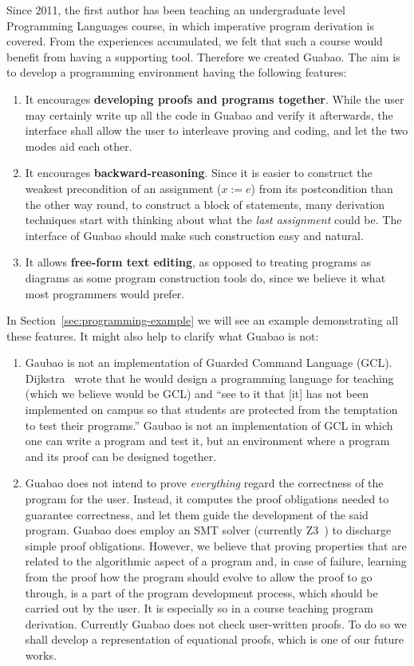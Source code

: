 \documentclass[runningheads]{llncs}
\newcommand{\Varid}[1]{\mathit{#1}}
\let\Varid\mathit
\begin{document}
Since 2011, the first author has been teaching an undergraduate level Programming Languages course, in which imperative program derivation is covered.
From the experiences accumulated, we felt that such a course would benefit from having a supporting tool.
Therefore we created Guabao.
The aim is to develop a programming environment having the following features:
\begin{enumerate}
\item It encourages {\bf developing proofs and programs together}.
While the user may certainly write up all the code in Guabao and verify it afterwards, the interface shall allow the user to interleave proving and coding, and let the two modes aid each other.
\item It encourages {\bf backward-reasoning}.
Since it is easier to construct the weakest precondition of an assignment (\ensuremath{\Varid{x}\mathbin{:=}\Varid{e}}) from its postcondition than the other way round,
to construct a block of statements, many derivation techniques start with thinking about what the \emph{last assignment} could be.
The interface of Guabao should make such construction easy and natural.
\item It allows {\bf free-form text editing}, as opposed to treating programs as diagrams as some program construction tools do, since we believe it what most programmers would prefer.
\end{enumerate}
In Section~\ref{sec:programming-example} we will see an example demonstrating all these features.
It might also help to clarify what Guabao is not:
\begin{enumerate}
\item Gaubao is not an implementation of Guarded Command Language (GCL).
Dijkstra~\cite{Dijkstra:98:Cruelty} wrote that he would
design a programming language for teaching (which we believe would be GCL) and ``see to it that [it] has not been implemented on campus so that students are protected from the temptation to test their programs.''
Gaubao is not an implementation of GCL in which one can write a program and test it, but an environment where a program and its proof can be designed together.
\item Guabao does not intend to prove \emph{everything} regard the correctness of the program for the user.
Instead, it computes the proof obligations needed to guarantee correctness, and let them guide the development of the said program.
Guabao does employ an SMT solver (currently Z3~\cite{MS:12:Z3}) to discharge simple proof obligations.
However, we believe that proving properties that are related to the algorithmic aspect of a program and, in case of failure, learning from the proof how the program should evolve to allow the proof to go through, is a part of the program development process, which should be carried out by the user.
It is especially so in a course teaching program derivation.
Currently Guabao does not check user-written proofs.
To do so we shall develop a representation of equational proofs, which is one of our future works.
\end{enumerate}
\end{document}
